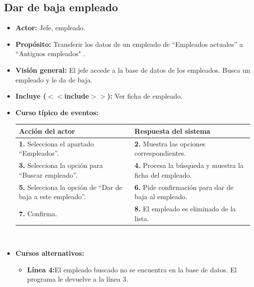 \documentclass[spanish,a4paper,11pt, twoside]{report}	%
\begin{document}

	\subsection{Dar de baja empleado}	
			\begin{itemize}
			\item \textbf{Actor:} Jefe, empleado.
			\item \textbf{Propósito:} Transferir los datos de un empleado de “Empleados actuales” a “Antiguos empleados" .
			\item \textbf{Visión general:} El jefe accede a
				la base de datos de los empleados. Busca un empleado y le da de baja.
			\item \textbf{Incluye ($<<$include$>>$):} Ver ficha de empleado.
			\item \textbf{Curso típico de eventos:} 	\\
				\begin{tabular}{|p{6cm}||p{6cm}|}
				\hline
				\textbf{Acción del actor} & \textbf{Respuesta del sistema} \\ \hline \hline
				\textbf{1.} Selecciona el apartado ``Empleados''. & 
				\textbf{2.} Muestra las opciones correspondientes. \\ \hline
				\textbf{3.} Selecciona la opción para ``Buscar empleado''.	& 
				\textbf{4.} Procesa la búsqueda y muestra la ficha del empleado. \\ \hline
				\textbf{5.} Selecciona la opción de ``Dar de baja a este empleado''. & 
				\textbf{6.} Pide confirmación para dar de baja al empleado.\\ \hline
				\textbf{7.} Confirma. & 
				\textbf{8.} El empleado es eliminado de la lista. \\ \hline
			\end{tabular}
			\\
			\item \textbf{Cursos alternativos:} 
			\begin{itemize}
			\item  \textbf{Línea 4:}El empleado buscado no se encuentra en la base de datos. 
				El programa le devuelve a la línea 3.
			\end {itemize}
		\end{itemize}


\end{document}
